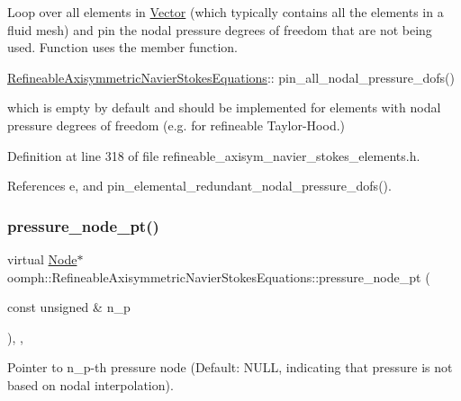 Loop over all elements in \hyperlink{classoomph_1_1Vector}{Vector} (which typically contains all the elements in a fluid mesh) and pin the nodal pressure degrees of freedom that are not being used. Function uses the member function. 


\begin{DoxyItemize}
\item {\ttfamily \hyperlink{classoomph_1_1RefineableAxisymmetricNavierStokesEquations}{Refineable\+Axisymmetric\+Navier\+Stokes\+Equations}\+:}\+: pin\+\_\+all\+\_\+nodal\+\_\+pressure\+\_\+dofs()
\end{DoxyItemize}which is empty by default and should be implemented for elements with nodal pressure degrees of freedom (e.\+g. for refineable Taylor-\/\+Hood.) 

Definition at line 318 of file refineable\+\_\+axisym\+\_\+navier\+\_\+stokes\+\_\+elements.\+h.



References e, and pin\+\_\+elemental\+\_\+redundant\+\_\+nodal\+\_\+pressure\+\_\+dofs().

\mbox{\label{classoomph_1_1RefineableAxisymmetricNavierStokesEquations_aa7fd86165c3410ed4c7ea736d6c3d976}} 
\subsubsection{\texorpdfstring{pressure\+\_\+node\+\_\+pt()}{pressure\_node\_pt()}}
{\footnotesize\ttfamily virtual \hyperlink{classoomph_1_1Node}{Node}$\ast$ oomph\+::\+Refineable\+Axisymmetric\+Navier\+Stokes\+Equations\+::pressure\+\_\+node\+\_\+pt (\begin{DoxyParamCaption}\item[{const unsigned \&}]{n\+\_\+p }\end{DoxyParamCaption})\hspace{0.3cm}{\ttfamily [inline]}, {\ttfamily [protected]}, {\ttfamily [virtual]}}



Pointer to n\+\_\+p-\/th pressure node (Default\+: N\+U\+LL, indicating that pressure is not based on nodal interpolation). 



